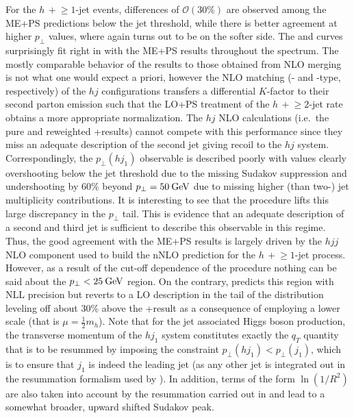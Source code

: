 For the $h\,+\!\ge\!1$-jet events, differences of $\mathcal{O}(30\%)$ are
observed among the ME+PS predictions below the jet threshold, while
there is better agreement at higher $p_\perp$ values, where again
\Herwig turns out to be on the softer side. The \Powheg and \Sherpa \NNLOPS 
curves surprisingly fit right in with the ME+PS results throughout 
the spectrum. The mostly comparable
behavior of the \NNLOPS results to those obtained from NLO merging is
not what one would expect a priori, however the NLO matching (\Powheg- 
and \SMCatNLO-type, respectively) of the $hj$ configurations transfers 
a differential $K$-factor to their second parton emission such that 
the LO+PS treatment of the $h\,+\!\ge\!2$-jet rate
obtains a more appropriate normalization. The $hj$ NLO calculations
(i.e.~the pure and \Minlo reweighted \GoSam{}+\Sherpa results) cannot
compete with this performance since they miss an adequate description 
of the second jet giving recoil to the $hj$ system.
Correspondingly, the $p_\perp(hj_1)$ observable is described poorly
with values clearly overshooting below the jet threshold due to the
missing Sudakov suppression and undershooting by 60\% beyond
$p_\perp=50\text{\:GeV}$ due to missing higher (than two-) jet multiplicity
contributions. It is interesting to see that the \Loopsim procedure
lifts this large discrepancy in the $p_\perp$ tail. This is evidence
that an adequate description of a second and third jet is sufficient
to describe this observable in this regime. Thus, the good agreement
with the ME+PS results is largely driven by the $hjj$ NLO component
used to build the nNLO prediction for the $h\,+\!\ge\!1$-jet
process. However, as a result of the cut-off dependence of the
procedure nothing can be said about the $p_\perp<25\text{\:GeV}$ region.
On the contrary, \Resbos predicts this region with NLL precision but
reverts to a LO description in the tail of the distribution leveling
off about 30\% above the \GoSam{}+\Sherpa result as a consequence of
employing a lower scale (that is $\mu=\tfrac{1}{2}m_h$). Note that for
the jet associated Higgs boson production, the transverse momentum of
the $hj_1$ system constitutes exactly the $q_T$ quantity that is to be
resummed by \Resbos imposing the constraint $p_\perp(hj_1)<p_\perp(j_1)$,
which is to ensure that $j_1$ is indeed the leading jet (as any other
jet is integrated out in the resummation formalism used by \Resbos).
In addition, terms of the form $\ln(1/R^2)$ are also taken into
account by the resummation carried out in \Resbos and lead to a
somewhat broader, upward shifted Sudakov peak.

